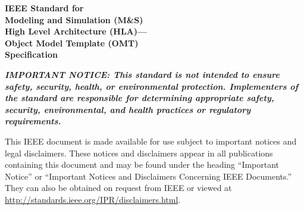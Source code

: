 \firststandardpage
\vspace*{1.30in}
{\bfseries\fontsize{22}{25}\selectfont
IEEE Standard for\\
Modeling and Simulation (M\&S)\\
High Level Architecture (HLA)---\\
Object Model Template (OMT)\\
Specification\par}

\vspace{0.49in}
{\bfseries\itshape\fontsize{10}{12}\selectfont
IMPORTANT NOTICE: This standard is not intended to ensure safety, security, health, or
environmental protection. Implementers of the standard are responsible for determining appropriate
safety, security, environmental, and health practices or regulatory requirements.\par
\vspace{12pt}
This IEEE document is made available for use subject to important notices and legal disclaimers. These
notices and disclaimers appear in all publications containing this document and may be found under the
heading ``Important Notice'' or ``Important Notices and Disclaimers Concerning IEEE Documents.''
They can also be obtained on request from IEEE or viewed at \url{http://standards.ieee.org/IPR/disclaimers.html}.\par}

\vspace{0.42in}

